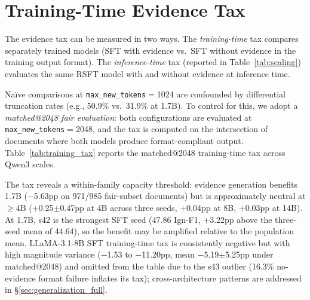 \section{Training-Time Evidence Tax}
\label{sec:training_tax}

The evidence tax can be measured in two ways. The \emph{training-time} tax compares separately trained models (SFT with evidence vs.\ SFT without evidence in the training output format). The \emph{inference-time} tax (reported in Table~\ref{tab:scaling}) evaluates the same RSFT model with and without evidence at inference time.

Na\"ive comparisons at \texttt{max\_new\_tokens}$=$1024 are confounded by differential truncation rates (e.g., 50.9\% vs.\ 31.9\% at 1.7B). To control for this, we adopt a \emph{matched@2048 fair evaluation}: both configurations are evaluated at \texttt{max\_new\_tokens}$=$2048, and the tax is computed on the intersection of documents where both models produce format-compliant output. Table~\ref{tab:training_tax} reports the matched@2048 training-time tax across Qwen3 scales.

The tax reveals a within-family capacity threshold: evidence generation benefits 1.7B ($-$5.63pp on 971/985 fair-subset documents) but is approximately neutral at $\geq$4B (+0.25$\pm$0.47pp at 4B across three seeds, +0.04pp at 8B, +0.03pp at 14B). At 1.7B, s42 is the strongest SFT seed (47.86 Ign-F1, +3.22pp above the three-seed mean of 44.64), so the benefit may be amplified relative to the population mean. LLaMA-3.1-8B SFT training-time tax is consistently negative but with high magnitude variance ($-$1.53 to $-$11.20pp, mean $-$5.19$\pm$5.25pp under matched@2048) and omitted from the table due to the s43 outlier (16.3\% no-evidence format failure inflates its tax); cross-architecture patterns are addressed in \S\ref{sec:generalization_full}.

